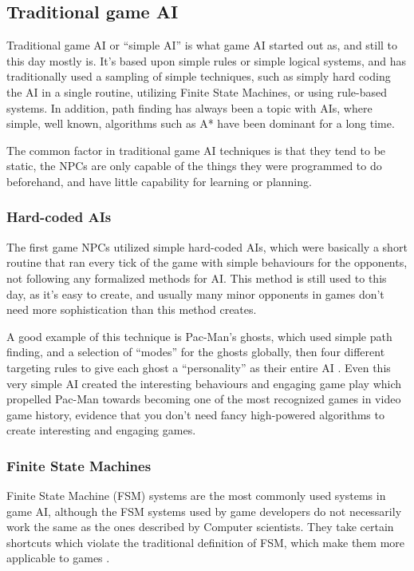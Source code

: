 \subsection{Traditional game AI}
\label{sec:traditional-game-ai}

Traditional game AI or ``simple AI'' is what game AI started out as, and still
to this day mostly is. It's based upon simple rules or simple logical systems,
and has traditionally used a sampling of simple techniques, such as simply hard
coding the AI in a single routine, utilizing Finite State Machines, or using
rule-based systems. In addition, path finding has always been a topic with AIs,
where simple, well known, algorithms such as A* have been dominant for a long
time.

The common factor in traditional game AI techniques is that they tend to be
static, the NPCs are only capable of the things they were programmed to do
beforehand, and have little capability for learning or planning.

\subsubsection{Hard-coded AIs}
\label{sec:hard-coded-ais}

The first game NPCs utilized simple hard-coded AIs, which were basically a short
routine that ran every tick of the game with simple behaviours for the
opponents, not following any formalized methods for AI. This method is still
used to this day, as it's easy to create, and usually many minor opponents in
games don't need more sophistication than this method creates.

A good example of this technique is Pac-Man's ghosts, which used simple path
finding, and a selection of ``modes'' for the ghosts globally, then four
different targeting rules to give each ghost a ``personality'' as their entire
AI \citep{birch2010pacman,pittmanpac}. Even this very simple AI created the
interesting behaviours and engaging game play which propelled Pac-Man towards
becoming one of the most recognized games in video game history, evidence that
you don't need fancy high-powered algorithms to create interesting and engaging
games.

\subsubsection{Finite State Machines}
\label{sec:finite-state-mach}

Finite State Machine (FSM) systems are the most commonly used systems in game
AI, although the FSM systems used by game developers do not necessarily work the
same as the ones described by Computer scientists. They take certain shortcuts
which violate the traditional definition of FSM, which make them more applicable
to games \citep{rabin2002implementing}.

